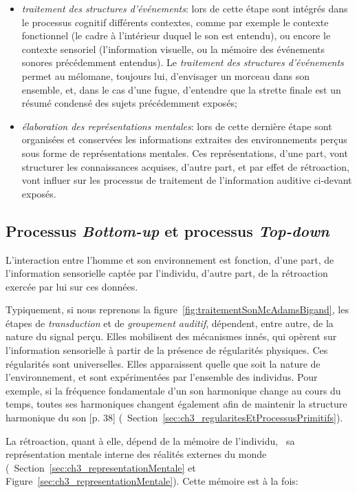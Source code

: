 \begin{itemize}
\item \emph{traitement des structures d'événements}: lors de cette étape sont intégrés dans le processus cognitif différents contextes, comme par exemple le contexte fonctionnel (le cadre à l'intérieur duquel le son est entendu), ou encore le contexte sensoriel (l'information visuelle, ou la mémoire des événements sonores précédemment entendus). Le \emph{traitement des structures d'événements} permet au mélomane, toujours lui, d'envisager un morceau dans son ensemble, et, dans le cas d'une fugue, d'entendre que la strette finale est un résumé condensé des sujets précédemment exposés;
\item \emph{élaboration des représentations mentales}: lors de cette dernière étape sont organisées et conservées les informations extraites des environnements perçus sous forme de représentations mentales. Ces représentations, d'une part, vont structurer les connaissances acquises, d'autre part, et par effet de rétroaction, vont influer sur les processus de traitement de l'information auditive ci-devant exposés.

\end{itemize}

\subsection{Processus \emph{Bottom-up} et processus \emph{Top-down}}
\label{sec:ch3_butd}

L'interaction entre l'homme et son environnement est fonction, d'une part, de l'information sensorielle captée par l'individu, d'autre part, de la rétroaction exercée par lui sur ces données. 

Typiquement, si nous reprenons la figure~\ref{fig:traitementSonMcAdamsBigand}, les étapes de \emph{transduction} et de \emph{groupement auditif}, dépendent, entre autre, de la nature du signal perçu. Elles mobilisent des mécanismes innés, qui opèrent sur l'information sensorielle à partir de la présence de régularités physiques. Ces régularités sont universelles. Elles apparaissent quelle que soit la nature de l'environnement, et sont expérimentées par l'ensemble des individus. Pour exemple, si la fréquence fondamentale d'un son harmonique change au cours du temps, toutes ses harmoniques changent également afin de maintenir la structure harmonique du son [p. 38]\citep{bregman1994auditory} (\cf~Section~\ref{sec:ch3_regularitesEtProcessusPrimitifs}).

La rétroaction, quant à elle, dépend de la mémoire de l'individu, \ie~sa représentation mentale interne des réalités externes du monde (\cf~Section~\ref{sec:ch3_representationMentale} et Figure~\ref{sec:ch3_representationMentale}). Cette mémoire est à la fois:

